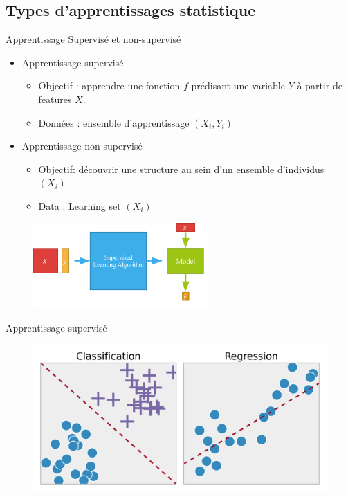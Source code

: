 \documentclass{beamer}
\begin{document}
\subsection{Types d'apprentissages statistique}
\begin{frame}{Apprentissage Supervisé et non-supervisé}
\begin{itemize}
	\item Apprentissage supervisé
	\begin{itemize}
		\item Objectif : apprendre une fonction $f$ prédisant une variable $Y$ à partir de
		features $X$.
		\item Données : ensemble d'apprentissage $(X_i, Y_i)$
	\end{itemize}
 \item Apprentissage non-supervisé
 		\begin{itemize}
 			\item  Objectif: découvrir une structure au sein d'un ensemble d'individus $(X_i)$
 			\item Data : Learning set $(X_i)$
 		\end{itemize}
\end{itemize}
	\begin{figure}
	\centering
	\includegraphics[width=0.6\textwidth]{Machine-Learning-3.png}
\end{figure}

\end{frame}


	\begin{frame}{Apprentissage supervisé}
	\centering
	\begin{figure}[h]
		\includegraphics[width=\linewidth]{CR.png}
	\end{figure}
\end{frame}	
\end{document}
